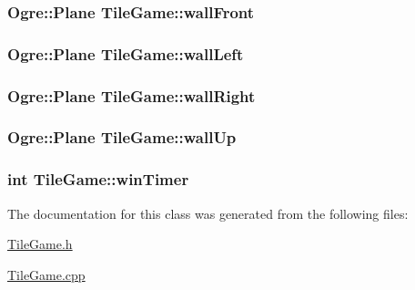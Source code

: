 \hypertarget{classTileGame_a97846181582b43470f0a1394e0dfcad8}{
\subsubsection[{wall\-Front}]{\setlength{\rightskip}{0pt plus 5cm}Ogre\-::\-Plane Tile\-Game\-::wall\-Front\hspace{0.3cm}{\ttfamily [protected]}}}\label{classTileGame_a97846181582b43470f0a1394e0dfcad8}
\hypertarget{classTileGame_a92cc3d1944d2bd572198479508722577}{
\subsubsection[{wall\-Left}]{\setlength{\rightskip}{0pt plus 5cm}Ogre\-::\-Plane Tile\-Game\-::wall\-Left\hspace{0.3cm}{\ttfamily [protected]}}}\label{classTileGame_a92cc3d1944d2bd572198479508722577}
\hypertarget{classTileGame_ae7de21d4feafcb1cc6f2d0434ddcfa9c}{
\subsubsection[{wall\-Right}]{\setlength{\rightskip}{0pt plus 5cm}Ogre\-::\-Plane Tile\-Game\-::wall\-Right\hspace{0.3cm}{\ttfamily [protected]}}}\label{classTileGame_ae7de21d4feafcb1cc6f2d0434ddcfa9c}
\hypertarget{classTileGame_a3679e7a4d3981c56c087f23f94b3b0ec}{
\subsubsection[{wall\-Up}]{\setlength{\rightskip}{0pt plus 5cm}Ogre\-::\-Plane Tile\-Game\-::wall\-Up\hspace{0.3cm}{\ttfamily [protected]}}}\label{classTileGame_a3679e7a4d3981c56c087f23f94b3b0ec}
\hypertarget{classTileGame_a05d9bbf0aebd4822ed518804eeb899fa}{
\subsubsection[{win\-Timer}]{\setlength{\rightskip}{0pt plus 5cm}int Tile\-Game\-::win\-Timer\hspace{0.3cm}{\ttfamily [protected]}}}\label{classTileGame_a05d9bbf0aebd4822ed518804eeb899fa}


The documentation for this class was generated from the following files\-:\begin{DoxyCompactItemize}
\item 
\hyperlink{TileGame_8h}{Tile\-Game.\-h}\item 
\hyperlink{TileGame_8cpp}{Tile\-Game.\-cpp}\end{DoxyCompactItemize}
